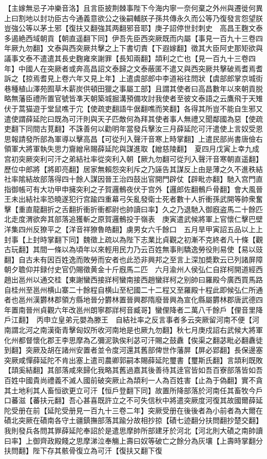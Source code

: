 【主嫁無忌子冲樂音洛】且言臣披荆棘事陛下今海内寧一奈何棄之外州與遷徙何異上曰割地以封功臣古今通義意欲公之後嗣輔朕子孫共傳永久而公等乃復發言怨望朕豈強公等以茅土邪【復扶又翻強其两翻邪音耶】庚子詔停世封刺史　高昌王麴文泰多遏絶西域朝貢【朝直遥翻下同】伊吾先臣西突厥既而内屬【事見一百九十三卷四年厥九勿翻】文泰與西突厥共擊之上下書切責【下遐嫁翻】徵其大臣阿史那矩欲與議事文泰不遣遣其長史麴雍來謝罪【長知兩翻】頡利之亡也【見一百九十三卷四年】中國人在突厥者或奔高昌詔文泰歸之文泰蔽匿不遣又與西突厥共擊破焉耆焉耆訴之【掠焉耆見上卷六年又見上年】上遣虞部郎中李道裕往問狀【虞部郎掌京城街巷種植山澤苑囿草木薪炭供頓田獵之事屬工部】且謂其使者曰高昌數年以來朝貢脱略無藩臣禮所置官號皆凖天朝築城掘溝預備攻討我使者至彼文泰語之云鷹飛于天雉伏于蒿猫遊于堂鼠噍于宂【使疏吏翻語牛倨翻噍而笑翻】各得其所豈不能自生邪又遣使謂薛延陀曰既為可汗則與天子匹敵何為拜其使者事人無禮又聞鄰國為惡【使疏吏翻下同間古莧翻】不誅善何以勸明年當發兵擊汝三月薛延陀可汗遣使上言奴受恩思報請發所部為軍導以擊高昌【可從刋入聲汗音寒上時掌翻】上遣民部尚書唐儉右領軍大將軍執失思力齎繒帛賜薛延陀與謀進取【繒慈陵翻】　夏四月戊寅上幸九成宫初突厥突利可汗之弟結社率從突利入朝【厥九勿翻可從刋入聲汗音寒朝直遥翻】歷位中郎將【將即亮翻】居家無賴怨突利斥之乃誣告其謀反上由是薄之久不進秩結社率隂結故部落得四十餘人謀因晉王治四鼓出官開門辟仗【辟毗亦翻】馳入宫門直指御帳可有大功甲申擁突利之子賀邏鶻夜伏于宫外【邏郎佐翻鶻戶骨翻】會大風晉王未出結社率恐曉遂犯行宫踰四重幕弓矢亂發衛士死者數十人折衝孫武開等帥衆奮擊【重直龍翻折之舌翻折衝折衝都尉也帥讀曰率】久之乃退馳入御廐盗馬二十餘匹北走度渭欲奔其部落追獲斬之原賀邏鶻投于嶺表　庚寅遣武候將軍上官懷仁擊巴壁洋集四州反獠平之【洋音祥獠魯皓翻】虜男女六千餘口　五月旱甲寅詔五品以上上封事【上封時掌翻下同】魏徵上疏以為陛下志業比貞觀之初漸不克終者凡十條【觀古玩翻】其間一條以為頃年以來輕用民力乃云百姓無事則驕逸勞役則易使【易以豉翻】自古未有因百姓逸而敗勞而安者也此恐非興邦之至言上深加奬歎云已列諸屏障朝夕聸仰并録付史官仍賜徵黄金十斤廐馬二匹　六月渝州人侯弘仁自牂柯開道經西趙出邕州以通交桂【東謝蠻西接牂柯蠻南接西趙蠻牂柯之别帥曰羅殿今廣西買馬路自桂州至邕州横山寨二十餘程自横山至杞國二十二程又至羅殿十程此即候弘仁所通者也邕州漢欝林郡領方縣地晉分欝林置晉興郡隋廢晉興為宣化縣屬欝林郡唐武德四年置南晉州貞觀六年改邕州朗寧郡牂柯音臧哥】蠻俚降者二萬八千餘戶【俚音里降戶江翻】　丙申立皇弟元嬰為滕王　自結社率之反言事者多云突厥留河南不便【河南謂北河之南漢衛青擊匈奴所收河南地是也厥九勿翻】秋七月庚戍詔右武候大將軍化州都督懷化郡王李思摩為乙彌泥孰俟利苾可汗賜之鼓纛【俟渠之翻苾毗必翻纛徒到翻】突厥及胡在諸州安置者並令度河還其舊部俾世作藩屏【屏必郢翻】長保邊塞突厥咸憚薛延陀不肯出塞上遣司農卿郭嗣本賜薛延陀璽書【璽斯氏翻】言頡利既敗【頡奚結翻】其部落咸來歸化我略其舊過嘉其後善待其逹官皆如吾百寮部落皆如吾百姓中國貴尚禮義不滅人國前破突厥止為頡利一人為百姓害【止為于偽翻】實不貪其土地利其人畜恒欲更立可汗【恒戶登翻下同】故置所降部落於河南任其畜牧今戶口蕃滋【蕃扶元翻】吾心甚喜既許立之不可失信秋中將遣突厥度河復其故國爾薛延陀受册在前【延陀受册見一百九十三卷二年】突厥受册在後後者為小前者為大爾在磧北突厥在磧南各守土疆鎮撫部落其踰分故相抄掠【磧七迹翻分扶問翻抄楚交翻】我則發兵各問其罪薛延陀奉詔於是遣思摩帥所部建牙於河北【河北則大磧之南帥讀曰率】上御齊政殿餞之思摩涕泣奉觴上壽曰奴等破亡之餘分為灰壤【上壽時掌翻分扶問翻】陛下存其骸骨復立為可汗【復扶又翻下復